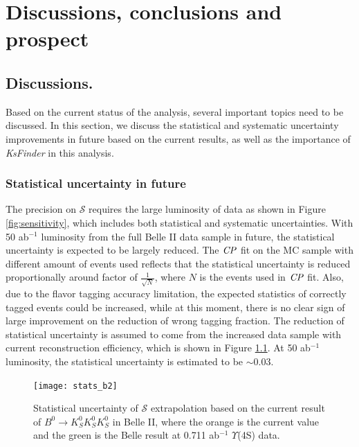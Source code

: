 \chapter{Discussions, conclusions and prospect}


\section{Discussions.}
Based on the current status of the analysis, several important topics need to be discussed. In this section, we discuss the statistical and systematic uncertainty improvements in future based on the current results, as well as the importance of \textit{KsFinder} in this analysis. 
\subsection{Statistical uncertainty in future}
The precision on $\mathcal{S}$ requires the large luminosity of data as shown in Figure \ref{fig:sensitivity}, which includes both statistical and systematic uncertainties. With 50 ab$^{-1}$ luminosity from the full Belle II data sample in future, the statistical uncertainty is expected to be largely reduced. The $\it{CP}$ fit on the MC sample with different amount of events used reflects that the statistical uncertainty is reduced proportionally around factor of $\frac{1}{\sqrt{N}}$, where $N$ is the events used in $\it{CP}$ fit. Also, due to the flavor tagging accuracy limitation, the expected statistics of correctly tagged events could be increased, while at this moment, there is no clear sign of large improvement on the reduction of wrong tagging fraction. The reduction of statistical uncertainty is assumed to come from the increased data sample with current reconstruction efficiency, which is shown in Figure \ref{fig:stats_future}. At 50 ab$^{-1}$ luminosity, the statistical uncertainty is estimated to be $\sim 0.03$.

\begin{figure}[htpb]
	\centering
	\texttt{[image: stats\_b2]}
	\caption{Statistical uncertainty of $\mathcal{S}$ extrapolation based on the current result of $B^0 \to K_S^0  K_S^0  K_S^0$ in Belle II, where the orange is the current value and the green is the Belle result at 0.711 ab$^{-1}$ $\Upsilon$(4S) data.}
	\label{fig:stats_future}
\end{figure}

